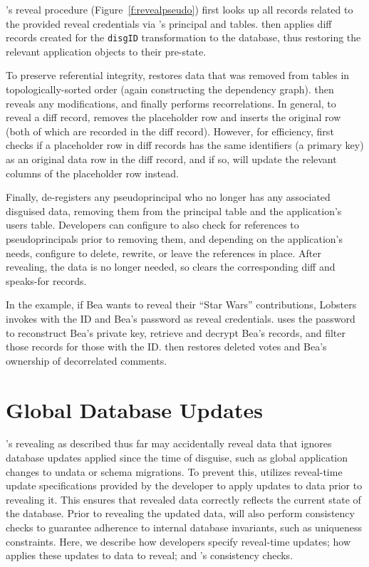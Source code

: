 \sys's reveal procedure (Figure~\ref{f:revealpseudo}) first looks up all \xx
records related to the provided reveal credentials via \sys's principal and \xx
tables.
%
\sys then applies diff records created for the \verb+disgID+ \xx transformation
to the database, thus restoring the relevant
application objects to their pre-\xxed state.

%
To preserve referential integrity, \sys restores
\xxed data that was removed from tables in topologically-sorted order (again
constructing the dependency graph).
%
\sys then reveals any modifications, and finally performs recorrelations. 
%
In general, to reveal a diff record, \sys removes the placeholder row
and inserts the original row (both of which are recorded in the diff record).
%
However, for efficiency, \sys first checks if a placeholder row in diff records
has the same identifiers (\eg a primary key) as an original data row in the diff
record, and if so, will update the relevant columns of the placeholder row instead.
%

%
Finally, \sys de-registers any pseudoprincipal who no longer has any associated
disguised data, removing them from the principal table and the application's
users table.
%
Developers can configure \sys to also check for references to pseudoprincipals
prior to removing them, and depending on the application's needs, configure \sys
to delete, rewrite, or leave the references in place.
%
After revealing, the \xxed data is no longer needed, so \sys clears the
corresponding diff and speaks-for records.
%

%
In the example, if Bea wants to reveal their ``Star Wars'' contributions,
Lobsters invokes \sys with the \xx ID and Bea's password as reveal credentials.
%
\sys uses the password to reconstruct Bea's private key, retrieve and decrypt
Bea's records, and filter those records for those with the \xx ID.
%
\sys then restores deleted votes and Bea's ownership of
decorrelated comments.
%

\section{Global Database Updates}
\label{s:design:database-updates}
\sys's revealing as described thus far may accidentally reveal data that ignores
database updates applied since the time of disguise, such as
global application changes to un\xxed data or schema migrations.
%
To prevent this, \sys utilizes reveal-time update
specifications provided by the
developer to apply updates to \xxed data prior to revealing it. This ensures
that revealed data correctly reflects the current state of the database.
%
Prior to revealing the updated data, \sys will also perform consistency checks
to guarantee adherence to internal database invariants, such as uniqueness
constraints.
%
Here, we describe how developers specify reveal-time updates; how \sys applies
these updates to data to reveal; and \sys's consistency checks.

